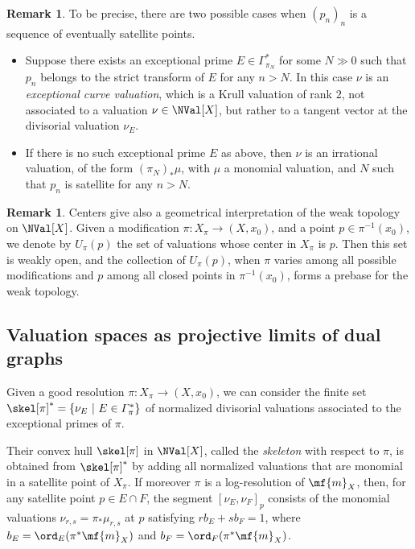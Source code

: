 \documentclass[11 pt, twoside, a4paper]{amsart}
\newcommand{\dgvert}[1]{\varGamma_{#1}^*}
\theoremstyle{definition}
\newtheorem{rem}[thm]{Remark}
\theoremstyle{definition}
\begin{document}
\begin{rem}\label{rem:exccurve}
To be precise, there are two possible cases when $(p_n)_n$ is a sequence of eventually satellite points.
\begin{itemize}
\item Suppose there exists an exceptional prime $E \in \dgvert{\pi_N}$ for some $N \gg 0$ such that $p_n$ belongs to the strict transform of $E$ for any $n > N$.
In this case $\nu$ is an \emph{exceptional curve valuation}, which is a Krull valuation of rank $2$, not associated to a valuation $\nu \in \NVal[X]$, but rather to a tangent vector at the divisorial valuation $\nu_E$.
\item If there is no such exceptional prime $E$ as above, then $\nu$ is an irrational valuation, of the form $(\pi_N)_* \mu$, with $\mu$ a monomial valuation, and $N$ such that $p_n$ is satellite for any $n > N$.
\end{itemize}
\end{rem}

\begin{rem}
Centers give also a geometrical interpretation of the weak topology on $\NVal[X]$.
Given a modification $\pi \colon X_\pi \to (X,x_0)$, and a point $p \in \pi^{-1}(x_0)$, we denote by $U_\pi(p)$ the set of valuations whose center in $X_\pi$ is $p$.
Then this set is weakly open, and the collection of $U_\pi(p)$, when $\pi$ varies among all possible modifications and $p$ among all closed points in $\pi^{-1}(x_0)$, forms a prebase for the weak topology.
\end{rem}

\subsection{Valuation spaces as projective limits of dual graphs}

Given a good resolution $\pi \colon X_\pi \to (X,x_0)$, we can consider the finite set $\skel[\pi]^*=\{\nu_E\ |\ E \in \dgvert{\pi}\}$ of normalized divisorial valuations associated to the exceptional primes of $\pi$.

Their convex hull $\skel[\pi]$ in $\NVal[X]$, called the \emph{skeleton} with respect to $\pi$, is obtained from $\skel[\pi]^*$ by adding all normalized valuations that are monomial in a satellite point of $X_\pi$.
If moreover $\pi$ is a log-resolution of $\mf{m}_X$, then, for any satellite point $p \in E \cap F$, the segment $[\nu_E,\nu_F]_p$ consists of the monomial valuations $\nu_{r,s}=\pi_* \mu_{r,s}$ at $p$ satisfying $rb_E+sb_F=1$, where $b_E=\ord_{E}(\pi^*\mf{m}_X)$ and $b_F=\ord_{F}(\pi^*\mf{m}_X)$.
\end{document}

